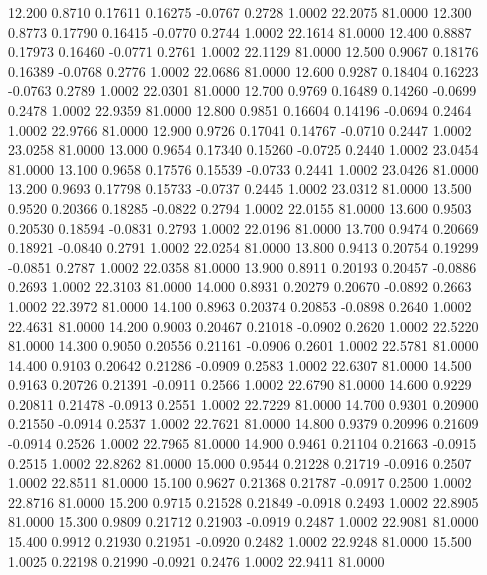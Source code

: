   12.200   0.8710   0.17611   0.16275  -0.0767   0.2728   1.0002  22.2075  81.0000
  12.300   0.8773   0.17790   0.16415  -0.0770   0.2744   1.0002  22.1614  81.0000
  12.400   0.8887   0.17973   0.16460  -0.0771   0.2761   1.0002  22.1129  81.0000
  12.500   0.9067   0.18176   0.16389  -0.0768   0.2776   1.0002  22.0686  81.0000
  12.600   0.9287   0.18404   0.16223  -0.0763   0.2789   1.0002  22.0301  81.0000
  12.700   0.9769   0.16489   0.14260  -0.0699   0.2478   1.0002  22.9359  81.0000
  12.800   0.9851   0.16604   0.14196  -0.0694   0.2464   1.0002  22.9766  81.0000
  12.900   0.9726   0.17041   0.14767  -0.0710   0.2447   1.0002  23.0258  81.0000
  13.000   0.9654   0.17340   0.15260  -0.0725   0.2440   1.0002  23.0454  81.0000
  13.100   0.9658   0.17576   0.15539  -0.0733   0.2441   1.0002  23.0426  81.0000
  13.200   0.9693   0.17798   0.15733  -0.0737   0.2445   1.0002  23.0312  81.0000
  13.500   0.9520   0.20366   0.18285  -0.0822   0.2794   1.0002  22.0155  81.0000
  13.600   0.9503   0.20530   0.18594  -0.0831   0.2793   1.0002  22.0196  81.0000
  13.700   0.9474   0.20669   0.18921  -0.0840   0.2791   1.0002  22.0254  81.0000
  13.800   0.9413   0.20754   0.19299  -0.0851   0.2787   1.0002  22.0358  81.0000
  13.900   0.8911   0.20193   0.20457  -0.0886   0.2693   1.0002  22.3103  81.0000
  14.000   0.8931   0.20279   0.20670  -0.0892   0.2663   1.0002  22.3972  81.0000
  14.100   0.8963   0.20374   0.20853  -0.0898   0.2640   1.0002  22.4631  81.0000
  14.200   0.9003   0.20467   0.21018  -0.0902   0.2620   1.0002  22.5220  81.0000
  14.300   0.9050   0.20556   0.21161  -0.0906   0.2601   1.0002  22.5781  81.0000
  14.400   0.9103   0.20642   0.21286  -0.0909   0.2583   1.0002  22.6307  81.0000
  14.500   0.9163   0.20726   0.21391  -0.0911   0.2566   1.0002  22.6790  81.0000
  14.600   0.9229   0.20811   0.21478  -0.0913   0.2551   1.0002  22.7229  81.0000
  14.700   0.9301   0.20900   0.21550  -0.0914   0.2537   1.0002  22.7621  81.0000
  14.800   0.9379   0.20996   0.21609  -0.0914   0.2526   1.0002  22.7965  81.0000
  14.900   0.9461   0.21104   0.21663  -0.0915   0.2515   1.0002  22.8262  81.0000
  15.000   0.9544   0.21228   0.21719  -0.0916   0.2507   1.0002  22.8511  81.0000
  15.100   0.9627   0.21368   0.21787  -0.0917   0.2500   1.0002  22.8716  81.0000
  15.200   0.9715   0.21528   0.21849  -0.0918   0.2493   1.0002  22.8905  81.0000
  15.300   0.9809   0.21712   0.21903  -0.0919   0.2487   1.0002  22.9081  81.0000
  15.400   0.9912   0.21930   0.21951  -0.0920   0.2482   1.0002  22.9248  81.0000
  15.500   1.0025   0.22198   0.21990  -0.0921   0.2476   1.0002  22.9411  81.0000

